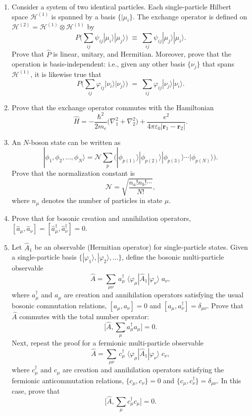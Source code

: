 \documentclass[pra,12pt]{revtex4}
\begin{document}
\begin{enumerate}
\item Consider a system of two identical particles.  Each
  single-particle Hilbert space $\mathscr{H}^{(1)}$ is spanned by a
  basis $\{|\mu_i\}$.  The exchange operator is defined on
  $\mathscr{H}^{(2)} = \mathscr{H}^{(1)} \otimes \mathscr{H}^{(1)}$ by
$$P \Big (\sum_{ij} \psi_{ij} |\mu_i\rangle|\mu_j\rangle \Big)
  \;\equiv\;  \sum_{ij} \psi_{ij} |\mu_j\rangle|\mu_i\rangle.$$
  Prove that $\hat{P}$ is linear, unitary, and Hermitian.  Moreover,
  prove that the operation is basis-independent: i.e., given any other
  basis $\{\nu_j\}$ that spans $\mathscr{H}^{(1)}$, it is likewise
  true that
$$P \Big (\sum_{ij} \varphi_{ij} |\nu_i\rangle|\nu_j\rangle \Big)
  \;=\;  \sum_{ij} \varphi_{ij} |\nu_j\rangle|\nu_i\rangle.$$
  \label{ex:1}

\item
  Prove that the exchange operator commutes with the Hamiltonian
$$\hat{H} = - \frac{\hbar^2}{2m_e} \Big(\nabla_1^2 + \nabla^2_2\Big) + \frac{e^2}{4\pi\varepsilon_0|\mathbf{r}_1 - \mathbf{r}_2|}.$$ \label{ex:2}

\item
  An $N$-boson state can be written as
$$|\phi_1,\phi_2,\dots,\phi_N\rangle = \mathcal{N} \sum_p \Big(|\phi_{p(1)}\rangle  |\phi_{p(2)}\rangle  |\phi_{p(3)}\rangle  \cdots  |\phi_{p(N)}\rangle\Big).$$
  Prove that the normalization constant is
$$\mathcal{N} = \sqrt{\frac{n_a!n_b!\cdots}{N!}},$$
  where $n_\mu$ denotes the number of particles in state $\mu$.
  \label{ex:boson_norm}

\item
  Prove that for bosonic creation and annihilation operators, $[\hat{a}_\mu,\hat{a}_\nu] = [\hat{a}_\mu^\dagger,\hat{a}_\nu^\dagger] = 0$.
  \label{ex:boson_commutators}

\item
  Let $\hat{A}_1$ be an observable (Hermitian operator) for
  single-particle states.  Given a single-particle basis
  $\{|\varphi_1\rangle,|\varphi_2\rangle,\dots\}$, define the
  bosonic multi-particle observable
  $$\hat{A} = \sum_{\mu\nu} \,a^\dagger_\mu \; \langle\varphi_\mu|\hat{A}_1|\varphi_\nu\rangle \; a_\nu,$$
  where $a_\mu^\dagger$ and $a_\mu$ are creation and annihilation
  operators satisfying the usual bosonic commutation relations,
  $[a_\mu,a_\nu] = 0$ and $[a_\mu,a_\nu^\dagger] = \delta_{\mu\nu}$.
  Prove that $\hat{A}$ commutes with the total number operator:
  $$\Big[\hat{A}, \sum_\mu a^\dagger_\mu a_\mu \Big] = 0.$$
  Next, repeat the proof for a fermionic multi-particle observable
  $$\hat{A} = \sum_{\mu\nu} \,c^\dagger_\mu \; \langle\varphi_\mu|\hat{A}_1|\varphi_\nu\rangle \; c_\nu,$$
  where $c_\mu^\dagger$ and $c_\mu$ are creation and annihilation
  operators satisfying the fermionic anticommutation relations,
  $\{c_\mu,c_\nu\} = 0$ and $\{c_\mu,c_\nu^\dagger\} = \delta_{\mu\nu}$.
  In this case, prove that
  $$\Big[\hat{A}, \sum_\mu c^\dagger_\mu c_\mu \Big] = 0.$$
  \label{ex:n_conserved}

\end{enumerate}
\end{document}
